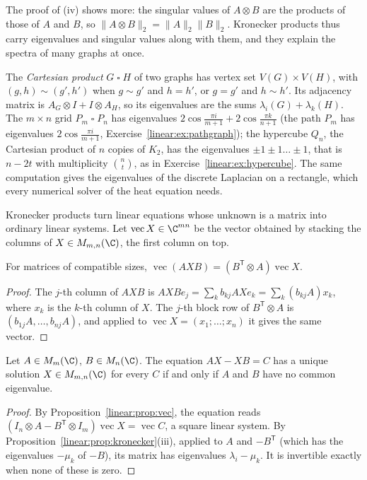 The proof of (iv) shows more: the singular values of $A\otimes B$ are the products of those of $A$ and $B$, so $\|A\otimes B\|_2=
\|A\|_2\|B\|_2$. Kronecker products thus carry eigenvalues and singular values along with them, and they explain the spectra of
many graphs at once.

\begin{example}\label{linear:exa:grid}
The \emph{Cartesian product} $G\mathbin\square H$ of two graphs has vertex set $V(G)\times V(H)$, with $(g,h)\sim(g',h')$ when
$g\sim g'$ and $h=h'$, or $g=g'$ and $h\sim h'$. Its adjacency matrix is $A_G\otimes I+I\otimes A_H$, so its eigenvalues are the sums
$\lambda_i(G)+\lambda_k(H)$. The $m\times n$ grid $P_m\mathbin\square P_n$ has eigenvalues $2\cos\frac{\pi i}{m+1}+2\cos\frac{\pi k}
{n+1}$ (the path $P_m$ has eigenvalues $2\cos\frac{\pi i}{m+1}$, Exercise~\ref{linear:ex:pathgraph}); the hypercube $Q_n$, the Cartesian
product of $n$ copies of $K_2$, has the eigenvalues $\pm1\pm1\dots\pm1$, that is $n-2t$ with multiplicity $\binom nt$, as in
Exercise~\ref{linear:ex:hypercube}. The same computation gives the eigenvalues of the discrete Laplacian on a rectangle, which every
numerical solver of the heat equation needs.
\end{example}

Kronecker products turn linear equations whose unknown is a matrix into ordinary linear systems. Let $\operatorname{vec}X\in\C^{mn}$
be the vector obtained by stacking the columns of $X\in M_{m,n}(\C)$, the first column on top.

\begin{proposition}\label{linear:prop:vec}
For matrices of compatible sizes, $\operatorname{vec}(AXB)=(B^{\mathsf T}\otimes A)\operatorname{vec}X$.
\end{proposition}
\begin{proof}
The $j$-th column of $AXB$ is $AXBe_j=\sum_kb_{kj}AXe_k=\sum_k(b_{kj}A)x_k$, where $x_k$ is the $k$-th column of $X$. The $j$-th block
row of $B^{\mathsf T}\otimes A$ is $(b_{1j}A,\dots,b_{nj}A)$, and applied to $\operatorname{vec}X=(x_1;\dots;x_n)$ it gives the same
vector.
\end{proof}

\begin{theorem}\label{linear:thm:sylvester}
Let $A\in M_m(\C)$, $B\in M_n(\C)$. The equation $AX-XB=C$ has a unique solution $X\in M_{m,n}(\C)$ for every $C$ if and only if $A$
and $B$ have no common eigenvalue.
\end{theorem}
\begin{proof}
By Proposition~\ref{linear:prop:vec}, the equation reads $(I_n\otimes A-B^{\mathsf T}\otimes I_m)\operatorname{vec}X=\operatorname{vec}C$, a
square linear system. By Proposition~\ref{linear:prop:kronecker}(iii), applied to $A$ and $-B^{\mathsf T}$ (which has the eigenvalues
$-\mu_k$ of $-B$), its matrix has eigenvalues $\lambda_i-\mu_k$. It is invertible exactly when none of these is zero.
\end{proof}

